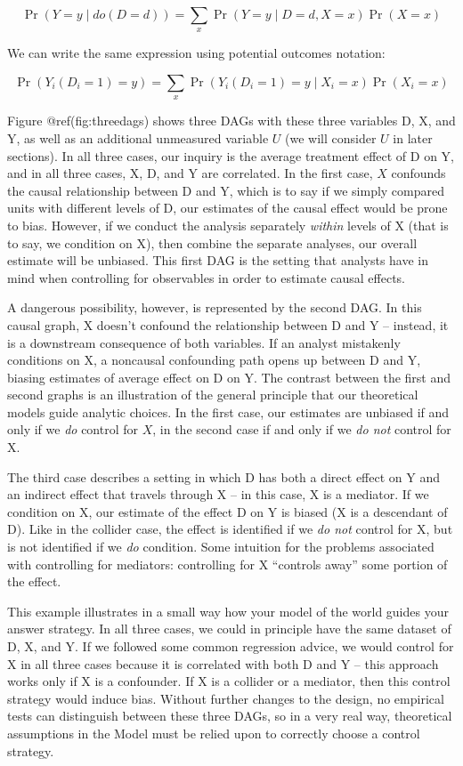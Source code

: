 \documentclass[
]{article}
\begin{document}
\[\Pr(Y = y \mid do(D=d)) = \sum_x \Pr(Y = y \mid D = d, X = x) \Pr(X = x)\]

We can write the same expression using potential outcomes notation:

\[\Pr(Y_i(D_i = 1) = y) = \sum_x \Pr(Y_i(D_i = 1) = y \mid X_i = x) \Pr(X_i = x)\]

Figure @ref(fig:threedags) shows three DAGs with these three variables
D, X, and Y, as well as an additional unmeasured variable \(U\) (we will
consider \(U\) in later sections). In all three cases, our inquiry is
the average treatment effect of D on Y, and in all three cases, X, D,
and Y are correlated. In the first case, \(X\) confounds the causal
relationship between D and Y, which is to say if we simply compared
units with different levels of D, our estimates of the causal effect
would be prone to bias. However, if we conduct the analysis separately
\emph{within} levels of X (that is to say, we condition on X), then
combine the separate analyses, our overall estimate will be unbiased.
This first DAG is the setting that analysts have in mind when
controlling for observables in order to estimate causal effects.

A dangerous possibility, however, is represented by the second DAG. In
this causal graph, X doesn't confound the relationship between D and Y
-- instead, it is a downstream consequence of both variables. If an
analyst mistakenly conditions on X, a noncausal confounding path opens
up between D and Y, biasing estimates of average effect on D on Y. The
contrast between the first and second graphs is an illustration of the
general principle that our theoretical models guide analytic choices. In
the first case, our estimates are unbiased if and only if we \emph{do}
control for \(X\), in the second case if and only if we \emph{do not}
control for X.

The third case describes a setting in which D has both a direct effect
on Y and an indirect effect that travels through X -- in this case, X is
a mediator. If we condition on X, our estimate of the effect D on Y is
biased (X is a descendant of D). Like in the collider case, the effect
is identified if we \emph{do not} control for X, but is not identified
if we \emph{do} condition. Some intuition for the problems associated
with controlling for mediators: controlling for X ``controls away'' some
portion of the effect.

This example illustrates in a small way how your model of the world
guides your answer strategy. In all three cases, we could in principle
have the same dataset of D, X, and Y. If we followed some common
regression advice, we would control for X in all three cases because it
is correlated with both D and Y -- this approach works only if X is a
confounder. If X is a collider or a mediator, then this control strategy
would induce bias. Without further changes to the design, no empirical
tests can distinguish between these three DAGs, so in a very real way,
theoretical assumptions in the Model must be relied upon to correctly
choose a control strategy.
\end{document}
